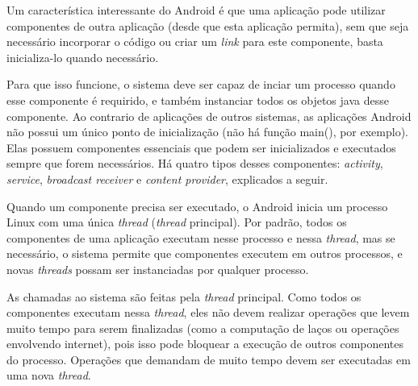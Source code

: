   Um característica interessante do Android é que uma aplicação pode utilizar
  componentes de outra aplicação (desde que esta aplicação permita), sem que seja necessário incorporar
  o código ou criar um \textit{link} para este componente, basta inicializa-lo quando necessário. 

  Para que isso funcione, o sistema deve ser capaz de inciar um processo quando 
  esse componente é requirido, e também instanciar todos os objetos java desse componente.
  Ao contrario de aplicações de outros sistemas, as aplicações Android não possui um único 
  ponto de inicialização (não há função main(), por exemplo). Elas possuem componentes essenciais 
  que podem ser inicializados e executados sempre que forem necessários. Há quatro tipos desses componentes:
  \textit{activity}, \textit{service}, \textit{broadcast receiver} e \textit{content provider}, explicados 
  a seguir.
  
  Quando um componente precisa ser executado, o Android inicia um processo Linux com uma 
  única \textit{thread} (\textit{thread} principal). 
  Por padrão, todos os componentes de uma aplicação executam nesse processo 
  e nessa \textit{thread}, mas se necessário, 
  o sistema permite que componentes executem em outros processos, 
  e novas \textit{threads} possam ser instanciadas por qualquer processo. 
  
  As chamadas ao sistema são feitas pela \textit{thread} principal. 
  Como todos os componentes executam nessa \textit{thread}, 
  eles não devem realizar operações que levem muito tempo 
  para serem finalizadas (como a computação de laços ou operações envolvendo 
  internet), pois isso pode bloquear a execução de outros componentes do processo. 
  Operações que demandam de muito tempo devem ser 
  executadas em uma nova \textit{thread}.
  
